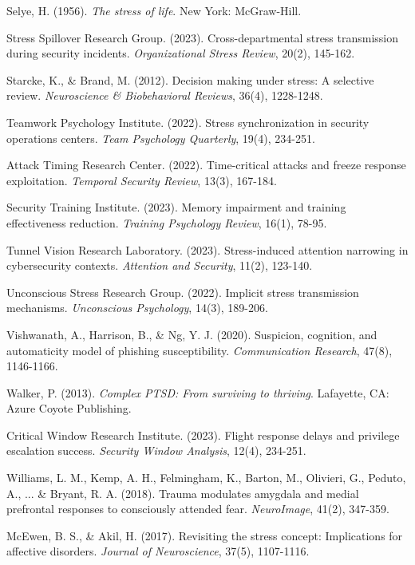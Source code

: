 \documentclass[11pt,a4paper]{article}
\begin{document}
\begin{thebibliography}{99}
Selye, H. (1956). \textit{The stress of life}. New York: McGraw-Hill.

Stress Spillover Research Group. (2023). Cross-departmental stress transmission during security incidents. \textit{Organizational Stress Review}, 20(2), 145-162.

Starcke, K., \& Brand, M. (2012). Decision making under stress: A selective review. \textit{Neuroscience \& Biobehavioral Reviews}, 36(4), 1228-1248.

Teamwork Psychology Institute. (2022). Stress synchronization in security operations centers. \textit{Team Psychology Quarterly}, 19(4), 234-251.

Attack Timing Research Center. (2022). Time-critical attacks and freeze response exploitation. \textit{Temporal Security Review}, 13(3), 167-184.

Security Training Institute. (2023). Memory impairment and training effectiveness reduction. \textit{Training Psychology Review}, 16(1), 78-95.

Tunnel Vision Research Laboratory. (2023). Stress-induced attention narrowing in cybersecurity contexts. \textit{Attention and Security}, 11(2), 123-140.

Unconscious Stress Research Group. (2022). Implicit stress transmission mechanisms. \textit{Unconscious Psychology}, 14(3), 189-206.

Vishwanath, A., Harrison, B., \& Ng, Y. J. (2020). Suspicion, cognition, and automaticity model of phishing susceptibility. \textit{Communication Research}, 47(8), 1146-1166.

Walker, P. (2013). \textit{Complex PTSD: From surviving to thriving}. Lafayette, CA: Azure Coyote Publishing.

Critical Window Research Institute. (2023). Flight response delays and privilege escalation success. \textit{Security Window Analysis}, 12(4), 234-251.

Williams, L. M., Kemp, A. H., Felmingham, K., Barton, M., Olivieri, G., Peduto, A., ... \& Bryant, R. A. (2018). Trauma modulates amygdala and medial prefrontal responses to consciously attended fear. \textit{NeuroImage}, 41(2), 347-359.

McEwen, B. S., \& Akil, H. (2017). Revisiting the stress concept: Implications for affective disorders. \textit{Journal of Neuroscience}, 37(5), 1107-1116.


\end{thebibliography}
\end{document}
